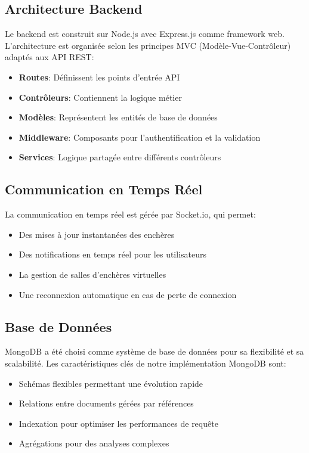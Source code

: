 \subsection{Architecture Backend}
Le backend est construit sur Node.js avec Express.js comme framework web. L'architecture est organisée selon les principes MVC (Modèle-Vue-Contrôleur) adaptés aux API REST:

\begin{itemize}
    \item \textbf{Routes}: Définissent les points d'entrée API
    \item \textbf{Contrôleurs}: Contiennent la logique métier
    \item \textbf{Modèles}: Représentent les entités de base de données
    \item \textbf{Middleware}: Composants pour l'authentification et la validation
    \item \textbf{Services}: Logique partagée entre différents contrôleurs
\end{itemize}

\subsection{Communication en Temps Réel}
La communication en temps réel est gérée par Socket.io, qui permet:

\begin{itemize}
    \item Des mises à jour instantanées des enchères
    \item Des notifications en temps réel pour les utilisateurs
    \item La gestion de salles d'enchères virtuelles
    \item Une reconnexion automatique en cas de perte de connexion
\end{itemize}

\subsection{Base de Données}
MongoDB a été choisi comme système de base de données pour sa flexibilité et sa scalabilité. Les caractéristiques clés de notre implémentation MongoDB sont:

\begin{itemize}
    \item Schémas flexibles permettant une évolution rapide
    \item Relations entre documents gérées par références
    \item Indexation pour optimiser les performances de requête
    \item Agrégations pour des analyses complexes
\end{itemize}